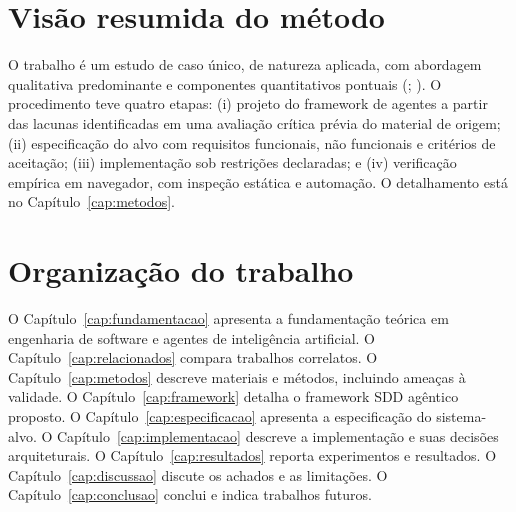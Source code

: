\section{Visão resumida do método}
\label{sec:metodo-resumido}

O trabalho é um estudo de caso único, de natureza aplicada, com abordagem
qualitativa predominante e componentes quantitativos pontuais
(; ). O procedimento teve quatro
etapas: (i) projeto do framework de agentes a partir das lacunas identificadas
em uma avaliação crítica prévia do material de origem; (ii) especificação do
alvo com requisitos funcionais, não funcionais e critérios de aceitação;
(iii) implementação sob restrições declaradas; e (iv) verificação empírica em
navegador, com inspeção estática e automação. O detalhamento está no
Capítulo~\ref{cap:metodos}.

\section{Organização do trabalho}
\label{sec:organizacao}

O Capítulo~\ref{cap:fundamentacao} apresenta a fundamentação teórica em
engenharia de software e agentes de inteligência artificial. O
Capítulo~\ref{cap:relacionados} compara trabalhos correlatos. O
Capítulo~\ref{cap:metodos} descreve materiais e métodos, incluindo ameaças à
validade. O Capítulo~\ref{cap:framework} detalha o framework SDD agêntico
proposto. O Capítulo~\ref{cap:especificacao} apresenta a especificação do
sistema-alvo. O Capítulo~\ref{cap:implementacao} descreve a implementação e suas
decisões arquiteturais. O Capítulo~\ref{cap:resultados} reporta experimentos e
resultados. O Capítulo~\ref{cap:discussao} discute os achados e as limitações. O
Capítulo~\ref{cap:conclusao} conclui e indica trabalhos futuros.
